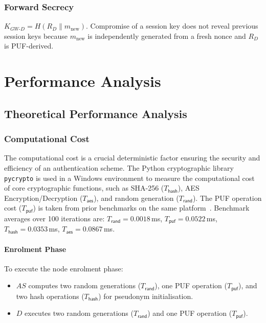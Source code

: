 \documentclass[12pt,a4paper]{report}
\begin{document}
\subsection{Forward Secrecy}

$K_{GW\text{-}D} = H(R_D \| m_{\mathrm{new}})$.
Compromise of a session key does not reveal previous session keys because
$m_{\mathrm{new}}$ is independently generated from a fresh nonce and $R_D$ is
PUF-derived.

\chapter{Performance Analysis}

\section{Theoretical Performance Analysis}

\subsection{Computational Cost}

The computational cost is a crucial deterministic factor ensuring the security and
efficiency of an authentication scheme.
The Python cryptographic library \texttt{pycrypto} is used in a Windows environment
to measure the computational cost of core cryptographic functions, such as SHA-256
($T_{\mathsf{hash}}$), AES Encryption/Decryption ($T_{\mathsf{aes}}$), and random
generation ($T_{\mathsf{rand}}$).
The PUF operation cost ($T_{\mathsf{puf}}$) is taken from prior benchmarks on the
same platform~\cite{zheng2022puf}.
Benchmark averages over 100 iterations are: $T_{\mathsf{rand}} = 0.0018$\,ms,
$T_{\mathsf{puf}} = 0.0522$\,ms, $T_{\mathsf{hash}} = 0.0353$\,ms,
$T_{\mathsf{aes}} = 0.0867$\,ms.

\subsubsection{Enrolment Phase}

To execute the node enrolment phase:
\begin{itemize}
  \item $AS$ computes two random generations ($T_{\mathsf{rand}}$), one PUF
    operation ($T_{\mathsf{puf}}$), and two hash operations ($T_{\mathsf{hash}}$)
    for pseudonym initialisation.
  \item $D$ executes two random generations ($T_{\mathsf{rand}}$) and one PUF
    operation ($T_{\mathsf{puf}}$).
\end{itemize}
\end{document}
